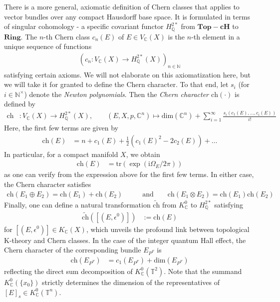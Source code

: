 \begin{rem}
\label{rem:chchar}
There is a more general, axiomatic definition of Chern classes that applies to vector bundles over any compact Hausdorff base space.
It is formulated in terms of singular cohomology - a specific covariant functor $H_{\mathbb{Q}}^{2\ast}$ from $\mathbf{Top-cH}$ to $\mathbf{Ring}$. The $n$-th Chern class $c_{n}(E)$ of $E \in V_{\mathbb{C}}(X)$ is the $n$-th element in a unique sequence of functions
\begin{align*}
  \left(
    c_{n}
    \colon
    V_{\mathbb{C}}(X)
    \to
    H_{\mathbb{Q}}^{2\ast}(X)
  \right)_{n\in\mathbb{N}}
\end{align*}
satisfying certain axioms.
We will not elaborate on this axiomatization here, but we will take it for granted to define the Chern character.
To that end, let $s_{i}$ (for $i \in \mathbb{N}^{\times}$) denote the \textit{Newton polynomials}.
Then the \textit{Chern character $\mathrm{ch}(\cdot)$} is defined by
\begin{align*}
  \mathrm{ch}
  &\colon
   V_{\mathbb{C}}(X)
  \to
  H_{\mathbb{Q}}^{2\ast}(X)
  ,\qquad
  (E,X,p,\mathbb{C}^{n})
  \mapsto
  \mathrm{dim}(\mathbb{C}^{n})
  +
  \sum_{i=1}^{\infty}
  \frac{s_{i}(c_{1}(E),\ldots,c_{i}(E))}{i!}
\end{align*}
Here, the first few terms are given by
\begin{align*}
  \mathrm{ch}(E)
  &=
  n
  +
  c_{1}(E)
  +
  \frac{1}{2}
  (c_{1}(E)^{2} - 2c_{2}(E))
  +
  \ldots
\end{align*}
In particular, for a compact manifold $X$, we obtain
\begin{align*}
  \mathrm{ch}(E)
  &=
  \mathrm{tr}(\exp(\mathrm{i}\Omega_{E}/2\pi))
\end{align*}
as one can verify from the expression above for the first few terms.
In either case, the Chern character satisfies
\begin{align*}
  \mathrm{ch}(E_{1} \oplus E_{2})
  =
  \mathrm{ch}(E_{1})
  +
  \mathrm{ch}(E_{2})
  \qquad
  &\text{and}
  \qquad
  \mathrm{ch}(E_{1} \otimes E_{2})
  =
  \mathrm{ch}(E_{1})
  \mathrm{ch}(E_{2})
\end{align*}
Finally, one can define a natural transformation $\widetilde{\mathrm{ch}}$ from $K_{\mathbb{C}}^{0}$ to $H_{\mathbb{Q}}^{2\ast}$ satisfying
\begin{align*}
  \widetilde{\mathrm{ch}}([(E,\epsilon^{0})])
  &:=
  \mathrm{ch}(E)
\end{align*}
for $[(E,\epsilon^{0})] \in K_{\mathbb{C}}(X)$, which unveils the profound link between topological K-theory and Chern classes.
In the case of the integer quantum Hall effect, the Chern character of the corresponding bundle $E_{P^{F}}$ is
\begin{align*}
  \mathrm{ch}(E_{P^{F}})
  &=
  c_{1}(E_{P^{F}})
  +
  \mathrm{dim}(E_{P^{F}})
\end{align*}
reflecting the direct sum decomposition of $K_{\mathbb{C}}^{0}(\mathbb{T}^{2})$.
Note that the summand $K_{\mathbb{C}}^{0}(\lbrace x_{0} \rbrace)$ strictly determines the dimension of the representatives of $[E]_{s} \in K_{\mathbb{C}}^{0}(\mathbb{T}^{n})$.
\end{rem}
